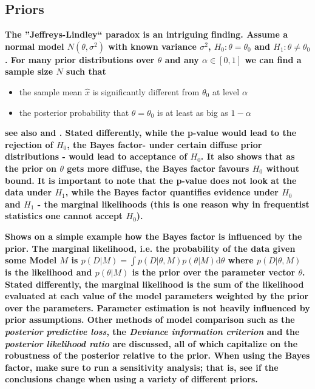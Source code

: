 \documentclass[12pt]{scrartcl}
\begin{document}
\subsection{Priors}
\begin{description}
  \item {}
  
  \textbf{The ''Jeffreys-Lindley`` paradox is an intriguing finding. Assume a normal model $N(\theta, \sigma^2)$ with known variance $\sigma^2$, $H_0: \theta = \theta_0$ and $H_1: \theta \neq \theta_0$. For many prior distributions over $\theta$ and any $\alpha \in [0, 1]$ we can find a sample size $N$ such that}
  
  \begin{itemize}
    \item the sample mean $\hat x$ is significantly different from $\theta_0$ at level $\alpha$
    \item the posterior probability that $\theta = \theta_0$ is at least as big as $1 - \alpha$
  \end{itemize}
  
  \textbf{see also \cite{sprenger2013testing} and \cite{robert2014jeffreys}. Stated differently, while the p-value would lead to the rejection of $H_0$, the Bayes factor- under certain diffuse prior distributions - would lead to acceptance of $H_0$. It also shows that as the prior on $\theta$ gets more diffuse, the Bayes factor favours $H_0$ without bound. It is important to note that the p-value does not look at the data under $H_1$, while the Bayes factor quantifies evidence under $H_0$ and $H_1$ - the marginal likelihoods (this is one reason why in frequentist statistics one cannot accept $H_0$).
  }
  
  \item {}
 
  \item {}
  
  \textbf{Shows on a simple example how the Bayes factor is influenced by the prior. The marginal likelihood, i.e. the probability of the data given some Model $M$ is $p(D|M) = \int p(D|\theta, M)p(\theta| M) \mathrm{d}\theta$ where $p(D|\theta, M)$ is the likelihood and $p(\theta|M)$ is the prior over the parameter vector $\theta$. Stated differently, the marginal likelihood is the sum of the likelihood evaluated at each value of the model parameters weighted by the prior over the parameters. Parameter estimation is not heavily influenced by prior assumptions. Other methods of model comparison such as the \emph{posterior predictive loss}, the \emph{Deviance information criterion} and the \emph{posterior likelihood ratio} are discussed, all of which capitalize on the robustness of the posterior relative to the prior. When using the Bayes factor, make sure to run a sensitivity analysis; that is, see if the conclusions change when using a variety of different priors.}
  

\end{description}
\end{document}
